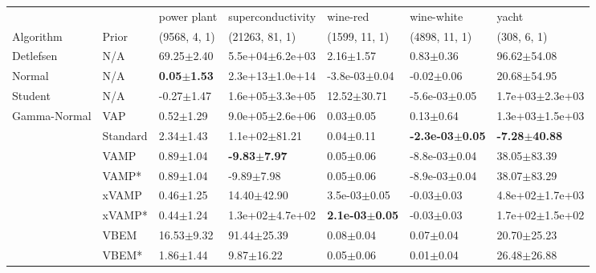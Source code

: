 \begin{tabular}{lllllll}
\midrule
             &       &             power plant &        superconductivity &                   wine-red &                  wine-white &                     yacht \\
Algorithm & Prior& (9568, 4, 1)& (21263, 81, 1)& (1599, 11, 1)& (4898, 11, 1)& (308, 6, 1)\\
\midrule
Detlefsen & N/A &          69.25$\pm$2.40 &      5.5e+04$\pm$6.2e+03 &              2.16$\pm$1.57 &               0.83$\pm$0.36 &           96.62$\pm$54.08 \\
Normal & N/A &  \textbf{0.05$\pm$1.53} &      2.3e+13$\pm$1.0e+14 &          -3.8e-03$\pm$0.04 &              -0.02$\pm$0.06 &           20.68$\pm$54.95 \\
Student & N/A &          -0.27$\pm$1.47 &      1.6e+05$\pm$3.3e+05 &            12.52$\pm$30.71 &           -5.6e-03$\pm$0.05 &       1.7e+03$\pm$2.3e+03 \\
Gamma-Normal & VAP &           0.52$\pm$1.29 &      9.0e+05$\pm$2.6e+06 &              0.03$\pm$0.05 &               0.13$\pm$0.64 &       1.3e+03$\pm$1.5e+03 \\
             & Standard &           2.34$\pm$1.43 &        1.1e+02$\pm$81.21 &              0.04$\pm$0.11 &  \textbf{-2.3e-03$\pm$0.05} &  \textbf{-7.28$\pm$40.88} \\
             & VAMP &           0.89$\pm$1.04 &  \textbf{-9.83$\pm$7.97} &              0.05$\pm$0.06 &           -8.8e-03$\pm$0.04 &           38.05$\pm$83.39 \\
             & VAMP* &           0.89$\pm$1.04 &           -9.89$\pm$7.98 &              0.05$\pm$0.06 &           -8.9e-03$\pm$0.04 &           38.07$\pm$83.29 \\
             & xVAMP &           0.46$\pm$1.25 &          14.40$\pm$42.90 &           3.5e-03$\pm$0.05 &              -0.03$\pm$0.03 &       4.8e+02$\pm$1.7e+03 \\
             & xVAMP* &           0.44$\pm$1.24 &      1.3e+02$\pm$4.7e+02 &  \textbf{2.1e-03$\pm$0.05} &              -0.03$\pm$0.03 &       1.7e+02$\pm$1.5e+02 \\
             & VBEM &          16.53$\pm$9.32 &          91.44$\pm$25.39 &              0.08$\pm$0.04 &               0.07$\pm$0.04 &           20.70$\pm$25.23 \\
             & VBEM* &           1.86$\pm$1.44 &           9.87$\pm$16.22 &              0.05$\pm$0.06 &               0.01$\pm$0.04 &           26.48$\pm$26.88 \\
\bottomrule
\end{tabular}

